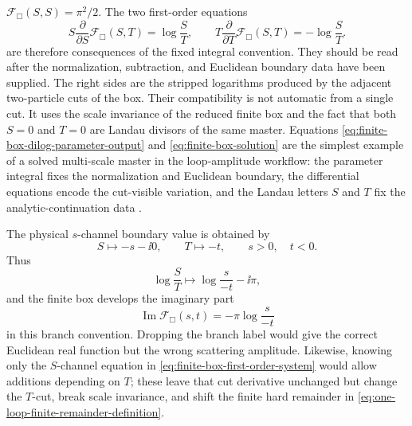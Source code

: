 \(\mathcal F_{\Box}(S,S)=\pi^2/2\).  The two first-order equations
\begin{equation}
  S\frac{\partial}{\partial S}\mathcal F_{\Box}(S,T)
  =
  \log\frac{S}{T},
  \qquad
  T\frac{\partial}{\partial T}\mathcal F_{\Box}(S,T)
  =
  -\log\frac{S}{T}.
  \label{eq:finite-box-first-order-system}
\end{equation}
are therefore consequences of the fixed integral convention.  They should be
read after the normalization, subtraction, and Euclidean boundary data have
been supplied.  The right sides are the stripped logarithms produced by the
adjacent two-particle cuts of the box.  Their compatibility is not automatic
from a single cut.  It uses the scale invariance of the reduced finite box and
the fact that both \(S=0\) and \(T=0\) are Landau divisors of the same master.
Equations \eqref{eq:finite-box-dilog-parameter-output} and
\eqref{eq:finite-box-solution} are the simplest example of a solved
multi-scale master in the loop-amplitude workflow: the parameter integral fixes
the normalization and Euclidean boundary, the differential equations encode
the cut-visible variation, and the Landau letters \(S\) and \(T\) fix the
analytic-continuation data
\cite{BDDK1994Unitarity,UssyukinaDavydychev1993Ladders}.

The physical \(s\)-channel boundary value is obtained by
\[
  S\mapsto -s-\ii0,\qquad T\mapsto -t,
  \qquad s>0,\quad t<0.
\]
Thus
\begin{equation}
  \log\frac{S}{T}
  \longmapsto
  \log\frac{s}{-t}-\ii\pi,
  \label{eq:finite-box-physical-log-branch}
\end{equation}
and the finite box develops the imaginary part
\[
  \operatorname{Im}\mathcal F_{\Box}(s,t)
  =
  -\pi\log\frac{s}{-t}
\]
in this branch convention.  Dropping the branch label would give the correct
Euclidean real function but the wrong scattering amplitude.  Likewise, knowing
only the \(S\)-channel equation in
\eqref{eq:finite-box-first-order-system} would allow additions depending on
\(T\); these leave that cut derivative unchanged but change the \(T\)-cut,
break scale invariance, and shift the finite hard remainder in
\eqref{eq:one-loop-finite-remainder-definition}.

